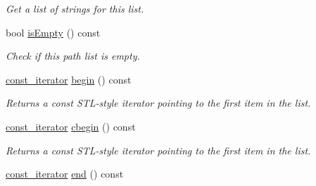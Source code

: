 \begin{DoxyCompactItemize}
\begin{DoxyCompactList}\small\item\em Get a list of strings for this list. \end{DoxyCompactList}\item 
bool \hyperlink{class_mdt_1_1_deploy_utils_1_1_path_list_ae2b68179e5536ee2bc063b133f88bb4a}{is\+Empty} () const \hypertarget{class_mdt_1_1_deploy_utils_1_1_path_list_ae2b68179e5536ee2bc063b133f88bb4a}{}\label{class_mdt_1_1_deploy_utils_1_1_path_list_ae2b68179e5536ee2bc063b133f88bb4a}

\begin{DoxyCompactList}\small\item\em Check if this path list is empty. \end{DoxyCompactList}\item 
\hyperlink{class_mdt_1_1_deploy_utils_1_1_path_list_a2666c4c9348c4f7a28014d4de9599717}{const\+\_\+iterator} \hyperlink{class_mdt_1_1_deploy_utils_1_1_path_list_a13c645c41b4492ab0d10b887cb77e739}{begin} () const \hypertarget{class_mdt_1_1_deploy_utils_1_1_path_list_a13c645c41b4492ab0d10b887cb77e739}{}\label{class_mdt_1_1_deploy_utils_1_1_path_list_a13c645c41b4492ab0d10b887cb77e739}

\begin{DoxyCompactList}\small\item\em Returns a const S\+T\+L-\/style iterator pointing to the first item in the list. \end{DoxyCompactList}\item 
\hyperlink{class_mdt_1_1_deploy_utils_1_1_path_list_a2666c4c9348c4f7a28014d4de9599717}{const\+\_\+iterator} \hyperlink{class_mdt_1_1_deploy_utils_1_1_path_list_a980da2988f38bf64bf76f6b61b572582}{cbegin} () const \hypertarget{class_mdt_1_1_deploy_utils_1_1_path_list_a980da2988f38bf64bf76f6b61b572582}{}\label{class_mdt_1_1_deploy_utils_1_1_path_list_a980da2988f38bf64bf76f6b61b572582}

\begin{DoxyCompactList}\small\item\em Returns a const S\+T\+L-\/style iterator pointing to the first item in the list. \end{DoxyCompactList}\item 
\hyperlink{class_mdt_1_1_deploy_utils_1_1_path_list_a2666c4c9348c4f7a28014d4de9599717}{const\+\_\+iterator} \hyperlink{class_mdt_1_1_deploy_utils_1_1_path_list_ab65fbf7392d22bf249583ff1aefd3f78}{end} () const \hypertarget{class_mdt_1_1_deploy_utils_1_1_path_list_ab65fbf7392d22bf249583ff1aefd3f78}{}\label{class_mdt_1_1_deploy_utils_1_1_path_list_ab65fbf7392d22bf249583ff1aefd3f78}


\end{DoxyCompactItemize}

